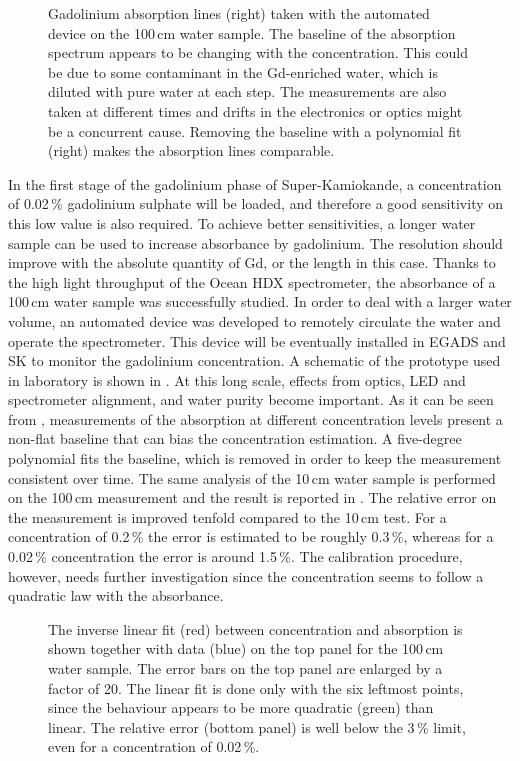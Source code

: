 \begin{figure}
	\centering
	\resizebox{\linewidth}{!}{}
	\caption{Gadolinium absorption lines (right) taken with the automated device on the 100\,cm water sample.
		The baseline of the absorption spectrum appears to be changing with the concentration.
		This could be due to some contaminant in the Gd-enriched water, which is diluted with pure water %
		at each step.
		The measurements are also taken at different times and drifts in the electronics or optics might be a %
		concurrent cause.
		Removing the baseline with a polynomial fit (right) makes the absorption lines comparable.}
	\label{fig:gad_fit}
\end{figure}

In the first stage of the gadolinium phase of Super-Kamiokande, a concentration of 0.02\,\% gadolinium sulphate %
will be loaded, and therefore a good sensitivity on this low value is also required.
To achieve better sensitivities, a longer water sample can be used to increase absorbance by gadolinium.
The resolution should improve with the absolute quantity of Gd, or the length in this case.
Thanks to the high light throughput of the Ocean HDX spectrometer, %
the absorbance of a 100\,cm water sample was successfully studied.
In order to deal with a larger water volume, an automated device was developed to remotely circulate the water and operate the spectrometer.
This device will be eventually installed in EGADS and SK to monitor the gadolinium concentration.
A schematic of the prototype used in laboratory is shown in .
At this long scale, effects from optics, LED and spectrometer alignment, and water purity become important.
As it can be seen from , measurements of the absorption at different concentration levels %
present a non-flat baseline that can bias the concentration estimation.
A five-degree polynomial fits the baseline, which is removed in order to keep the measurement consistent over time.
The same analysis of the 10\,cm water sample is performed on the 100\,cm measurement and the result is reported in .
The relative error on the measurement is improved tenfold compared to the 10\,cm test.
For a concentration of 0.2\,\% the error is estimated to be roughly 0.3\,\%, %
whereas for a 0.02\,\% concentration the error is around 1.5\,\%.
The calibration procedure, however, needs further investigation since the concentration seems to follow a quadratic law %
with the absorbance.


\begin{figure}
	\centering
	\resizebox{0.9\textwidth}{!}{}
	\caption{The inverse linear fit (red) between concentration and absorption %
		is shown together with data (blue) on the top panel for the 100\,cm water sample.
		The error bars on the top panel are enlarged by a factor of 20.
		The linear fit is done only with the six leftmost points, %
		since the behaviour appears to be more quadratic (green) than linear.
		The relative error (bottom panel) is well below the 3\,\% limit, %
		even for a concentration of 0.02\,\%.}
	\label{fig:gad_1m}
\end{figure}
